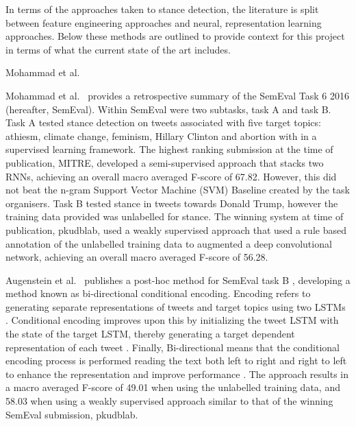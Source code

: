\documentclass[Dissertation.tex]{subfiles}
\begin{document}
In terms of the approaches taken to stance detection, the literature is split between feature engineering approaches and neural, representation learning approaches. Below these methods are outlined to provide context for this project in terms of what the current state of the art includes.

Mohammad et al.\ \cite{mohammadStanceSentimentTweets2016}

Mohammad et al.\ \cite{mohammadSemEval2016TaskDetecting2016} provides a retrospective summary of the SemEval Task 6 2016 \cite{TaskDetectingStance} (hereafter, SemEval). Within SemEval were two subtasks, task A and task B. Task A tested stance detection on tweets associated with five target topics: athiesm, climate change, feminism, Hillary Clinton and abortion with in  a supervised learning framework. The highest ranking submission at the time of publication, MITRE, developed a semi-supervised approach that stacks two RNNs, achieving an overall macro averaged F-score of 67.82. However, this did not beat the n-gram Support Vector Machine (SVM) Baseline created by the task organisers. Task B tested stance in tweets towards Donald Trump, however the training data provided was unlabelled for stance. The winning system at time of publication, pkudblab, used a weakly supervised approach that used a rule based annotation of the unlabelled training data to augmented a deep convolutional network, achieving an overall macro averaged F-score of 56.28.

Augenstein et al.\ \cite{augensteinStanceDetectionBidirectional2016} publishes a post-hoc method for SemEval task B \cite{TaskDetectingStance}, developing a method known as bi-directional conditional encoding. Encoding refers to generating separate representations of tweets and target topics using two LSTMs \cite{augensteinStanceDetectionBidirectional2016}\cite{hochreiterLongShorttermMemory1997}. Conditional encoding improves upon this by initializing the tweet LSTM with the state of the target LSTM, thereby generating a target dependent representation of each tweet \cite{augensteinStanceDetectionBidirectional2016}. Finally, Bi-directional means that the conditional encoding process is performed reading the text both left to right and right to left to enhance the representation and improve performance \cite{augensteinStanceDetectionBidirectional2016}. The approach results in a macro averaged F-score of 49.01 when using the unlabelled training data, and 58.03 when using a weakly supervised approach similar to that of the winning SemEval submission, pkudblab.
\end{document}
